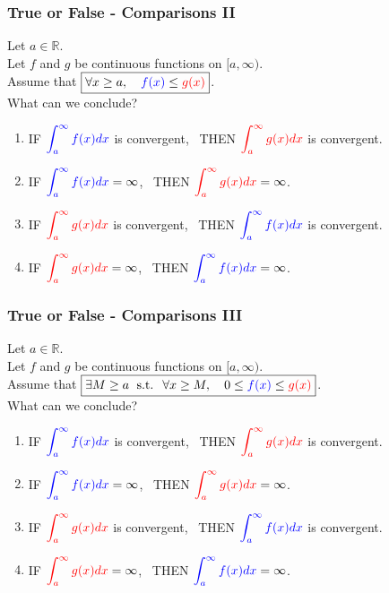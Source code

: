 \documentclass[14pt]{beamer}
\begin{document}
\begin{frame}[t]
	\fontsize{11}{11}\selectfont
	\frametitle{True or False - Comparisons II}

	Let $a \in \mathbb{R}$. \\ Let $f$ and $g$ be continuous functions on
	$[a, \infty)$. \\ Assume that $\displaystyle \boxed{\forall x \geq a, \quad {\color{blue} f(x)} \leq {\color{red} g(x)}}$.
	\\ What can we conclude?

	\begin{enumerate}
		\item IF $\displaystyle{\color{blue} \int_a^{\infty} f(x) dx}$ is convergent,
			\, THEN $\displaystyle{\color{red} \int_a^{\infty} g(x) dx}$ is convergent.

		\item IF $\displaystyle{\color{blue} \int_a^{\infty} f(x) dx}= \infty$, \,
			THEN $\displaystyle{\color{red} \int_a^{\infty} g(x) dx}= \infty$.

		\item IF $\displaystyle{\color{red} \int_a^{\infty} g(x) dx}$ is convergent,
			\, THEN $\displaystyle{\color{blue} \int_a^{\infty} f(x) dx}$ is
			convergent.

		\item IF $\displaystyle{\color{red} \int_a^{\infty} g(x) dx}= \infty$, \,
			THEN $\displaystyle{\color{blue} \int_a^{\infty} f(x) dx}= \infty$.
	\end{enumerate}
\end{frame}

\begin{frame}[t]
	\fontsize{11}{11}\selectfont
	\frametitle{True or False - Comparisons III}

	Let $a \in \mathbb{R}$. \\ Let $f$ and $g$ be continuous functions on
	$[a, \infty)$. \\ Assume that $\displaystyle \boxed{\exists M \geq a \; \text{ s.t. } \; \forall x \geq M, \quad 0 \leq {\color{blue} f(x)} \leq {\color{red} g(x)}}$.
	\\ What can we conclude?

	\begin{enumerate}
		\item IF $\displaystyle{\color{blue} \int_a^{\infty} f(x) dx}$ is convergent,
			\, THEN $\displaystyle{\color{red} \int_a^{\infty} g(x) dx}$ is convergent.

		\item IF $\displaystyle{\color{blue} \int_a^{\infty} f(x) dx}= \infty$, \,
			THEN $\displaystyle{\color{red} \int_a^{\infty} g(x) dx}= \infty$.

		\item IF $\displaystyle{\color{red} \int_a^{\infty} g(x) dx}$ is convergent,
			\, THEN $\displaystyle{\color{blue} \int_a^{\infty} f(x) dx}$ is
			convergent.

		\item IF $\displaystyle{\color{red} \int_a^{\infty} g(x) dx}= \infty$, \,
			THEN $\displaystyle{\color{blue} \int_a^{\infty} f(x) dx}= \infty$.
	\end{enumerate}
\end{frame}
\end{document}
